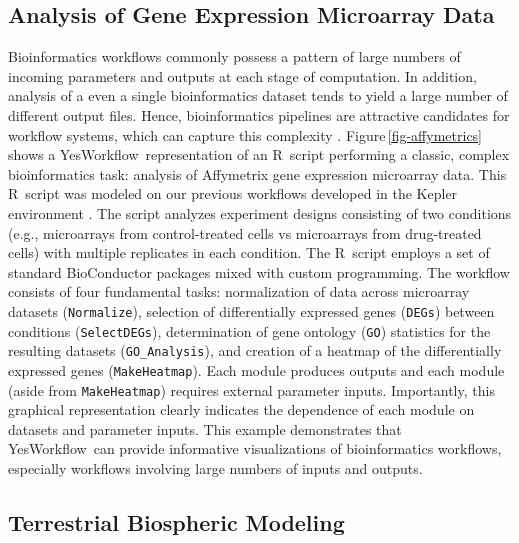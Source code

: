 \documentclass{article}
\newcommand{\YW}{\textsf{YesWorkflow}}
\newcommand{\ywm}[1]{\texttt{#1}}
\newcommand{\R}{\textsf{R}}
\newcommand{\figref}[1]{Figure\,\ref{#1}}
\begin{document}
\subsection{Analysis of Gene Expression Microarray Data}

 Bioinformatics workflows commonly possess a pattern of large numbers
 of incoming parameters and outputs at each stage of computation. In
 addition, analysis of a even a single bioinformatics dataset tends to
 yield a large number of different output files. Hence, bioinformatics
 pipelines are attractive candidates for workflow systems, which can
 capture this complexity \cite{bieda2012kepler}. \figref{fig-affymetrics}
 shows a \YW\ representation of an \R\ script performing a
 classic, complex bioinformatics task: analysis of Affymetrix gene
 expression microarray data. This \R\ script was modeled on our previous
 workflows developed in the Kepler environment \cite{stropp2012workflows}.
 The script analyzes experiment designs consisting of two conditions
 (e.g., microarrays from control-treated cells vs microarrays from
 drug-treated cells) with multiple replicates in each condition. The
 \R\ script employs a set of standard BioConductor
 \cite{gentleman2004bioconductor} packages mixed with custom programming. The
 workflow consists of four fundamental tasks: normalization of data
 across microarray datasets (\ywm{Normalize}), selection of
 differentially expressed genes (\ywm{DEGs}) between conditions
 (\ywm{SelectDEGs}), determination of gene ontology (\ywm{GO})
 statistics for the resulting datasets (\ywm{GO\_Analysis}), and
 creation of a heatmap of the differentially expressed genes
 (\ywm{MakeHeatmap}). Each module produces outputs and each module
 (aside from \ywm{MakeHeatmap}) requires external parameter
 inputs. Importantly, this graphical representation clearly indicates
 the dependence of each module on datasets and parameter inputs. This
 example demonstrates that \YW\ can provide informative visualizations
 of bioinformatics workflows, especially workflows involving large
 numbers of inputs and outputs.




\subsection{Terrestrial Biospheric Modeling}\label{sec-MsTMIP}
\end{document}
